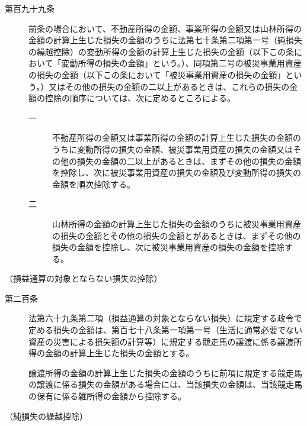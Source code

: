 \documentclass[twocolumn,a4j,10pt]{ltjtarticle}
\begin{document}
\begin{description}
\item[第百九十九条]前条の場合において、不動産所得の金額、事業所得の金額又は山林所得の金額の計算上生じた損失の金額のうちに法第七十条第二項第一号（純損失の繰越控除）の変動所得の金額の計算上生じた損失の金額（以下この条において「変動所得の損失の金額」という。）、同項第二号の被災事業用資産の損失の金額（以下この条において「被災事業用資産の損失の金額」という。）又はその他の損失の金額の二以上があるときは、これらの損失の金額の控除の順序については、次に定めるところによる。
\begin{description}
\item[一]不動産所得の金額又は事業所得の金額の計算上生じた損失の金額のうちに変動所得の損失の金額、被災事業用資産の損失の金額又はその他の損失の金額の二以上があるときは、まずその他の損失の金額を控除し、次に被災事業用資産の損失の金額及び変動所得の損失の金額を順次控除する。
\item[二]山林所得の金額の計算上生じた損失の金額のうちに被災事業用資産の損失の金額とその他の損失の金額とがあるときは、まずその他の損失の金額を控除し、次に被災事業用資産の損失の金額を控除する。
\end{description}
\end{description}
\noindent\hspace{10pt}（損益通算の対象とならない損失の控除）
\begin{description}
\item[第二百条]法第六十九条第二項（損益通算の対象とならない損失）に規定する政令で定める損失の金額は、第百七十八条第一項第一号（生活に通常必要でない資産の災害による損失額の計算等）に規定する競走馬の譲渡に係る譲渡所得の金額の計算上生じた損失の金額とする。
\item[]譲渡所得の金額の計算上生じた損失の金額のうちに前項に規定する競走馬の譲渡に係る損失の金額がある場合には、当該損失の金額は、当該競走馬の保有に係る雑所得の金額から控除する。
\end{description}
\noindent\hspace{10pt}（純損失の繰越控除）
\end{document}
